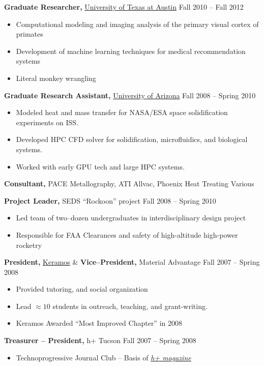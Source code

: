 \documentclass{res}
\begin{document}
\begin{resume}
{\bf Graduate Researcher,} \href{https://www.utexas.edu/}{University of Texas at Austin} \hfill
Fall 2010 -- Fall 2012
\begin{itemize} \itemsep -2pt
  \item Computational modeling and imaging analysis of the primary visual cortex of primates
  \item Development of machine learning techniques for medical recommendation systems
  \item Literal monkey wrangling
\end{itemize}

{\bf Graduate Research Assistant,} \href{https://www.arizona.edu/}{University of Arizona} \hfill
Fall 2008 -- Spring 2010
\begin{itemize} \itemsep -2pt
  \item Modeled heat and mass transfer for NASA/ESA space solidification experiments on ISS.
  \item Developed HPC CFD solver for solidification, microfluidics, and biological systems.
  \item Worked with early GPU tech and large HPC systems.
\end{itemize}

{\bf Consultant,} PACE Metallography, ATI Allvac, Phoenix Heat Treating \hfill Various

{\bf Project Leader,}  SEDS ``Rockoon''  project \hfill   Fall 2008 -- Spring 2010
\begin{itemize} \itemsep -2pt
  \item Led team of two--dozen undergraduates in interdisciplinary design project
  \item Responsible for FAA Clearances and safety of high-altitude high-power rocketry
\end{itemize}

{\bf President,} \href{https://ceramics.org/members/member-communities/classes/keramos}{Keramos} \& {\bf Vice--President,} Material Advantage \hfill Fall 2007 -- Spring 2008
\begin{itemize} \itemsep -2pt
  \item Provided tutoring, and social organization
  \item Lead $\approx10$ students in outreach, teaching, and grant-writing.
  \item Keramos Awarded ``Most Improved Chapter'' in 2008
\end{itemize}

{\bf Treasurer -- President,} h+ Tucson \hfill Fall 2007 -- Spring 2008
\begin{itemize} \itemsep -2pt
  \item Technoprogressive Journal Club -- Basis of \href{http://hplusmagazine.com/}{\textit{h+ magazine}}
\end{itemize}


\end{resume}
\end{document}
